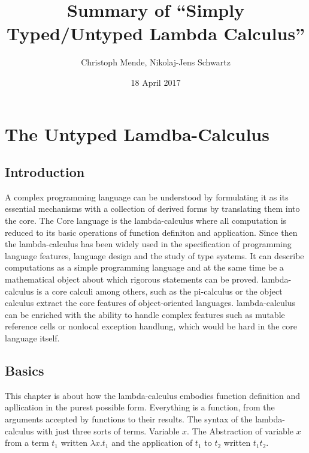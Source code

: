 \documentclass[acmlarge]{acmart}
\begin{document}

\title{Summary of ``Simply Typed/Untyped Lambda Calculus''}
\author{Christoph Mende, Nikolaj-Jens Schwartz}
\date{18 April 2017}
\maketitle

\section{The Untyped Lamdba-Calculus}\cite{Pierce:2002:TPL:509043}
\subsection{Introduction}
A complex programming language can be understood by formulating it as its essential mechanisms with a collection of derived forms by translating them into the core.
The Core language is the lambda-calculus where all computation is reduced to its basic operations of function definiton and application.
Since then the lambda-calculus has been widely used in the specification of programming language features, language design and the study of type systems.
It can describe computations as a simple programming language and at the same time be a mathematical object about which rigorous statements can be proved.
lambda-calculus is a core calculi among others, such as the pi-calculus or the object calculus extract the core features of object-oriented languages.
lambda-calculus can be enriched with the ability to handle complex features such as mutable reference cells or nonlocal exception handlung, which would be hard in the core language itself.

\subsection{Basics}
This chapter is about how the lambda-calculus embodies function definition and apllication in the purest possible form. Everything is a function, from the arguments accepted by functions to their results.
The syntax of the lambda-calculus with just three sorts of terms.
Variable $x$. The Abstraction of variable $x$ from a term $t_1$ written $\lambda x.t_1$ and the application of $t_1$ to $t_2$ written $t_1 t_2$.
\end{document}

